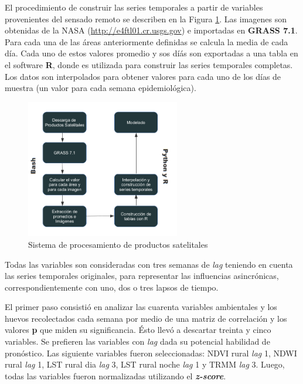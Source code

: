   \par El procedimiento de construir las series temporales a partir de variables
    provenientes del sensado remoto se describen en la Figura \ref{fig:sistema}.
    Las imagenes son obtenidas de la NASA (\url{http://e4ftl01.cr.usgs.gov}) e
    importadas en \textbf{GRASS 7.1}. Para cada una de las áreas anteriormente
    definidas se calcula la media de cada día. Cada uno de estos valores
    promedio y sos díás son exportadas a una tabla en el software \textbf{R},
    donde es utilizada para construir las series temporales completas.
    Los datos son interpolados para obtener valores para cada uno de los
    días de muestra (un valor para cada semana epidemiológica).
    \begin{figure}[hbt]
    \centering%
    \includegraphics[width=0.6\textwidth]{images/sistema}%
    \caption{Sistema de procesamiento de productos satelitales}\label{fig:sistema}
    \end{figure}

  \par Todas las variables son consideradas con tres semanas de \textit{lag}
    teniendo en cuenta las series temporales originales, para representar las
    influencias asincrónicas, correspondientemente con uno, dos o tres
    lapsos de tiempo.

  \par El primer paso consistió en analizar las cuarenta variables ambientales
    y los huevos recolectados cada semana por medio de una matriz de correlación
    y los valores \textbf{p} que miden su significancia. Ésto llevó a descartar
    treinta y cinco variables. Se prefieren las variables con \textit{lag} dada
    su potencial habilidad de pronóstico. Las siguiente variables fueron
    seleccionadas: NDVI rural \textit{lag} 1, NDWI rural \textit{lag} 1, LST rural dia \textit{lag} 3,
    LST rural noche \textit{lag} 1 y TRMM \textit{lag} 3. Luego, todas las
    variables fueron normalizadas utilizando el \textbf{\textit{z-score}}.

